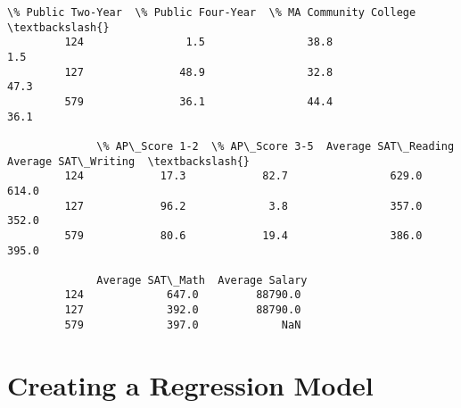 \documentclass[11pt]{article}
\begin{document}
\begin{Verbatim}[commandchars=\\\{\}]
              \% Public Two-Year  \% Public Four-Year  \% MA Community College  \textbackslash{}
         124                1.5                38.8                     1.5   
         127               48.9                32.8                    47.3   
         579               36.1                44.4                    36.1   
         
              \% AP\_Score 1-2  \% AP\_Score 3-5  Average SAT\_Reading  Average SAT\_Writing  \textbackslash{}
         124            17.3            82.7                629.0                614.0   
         127            96.2             3.8                357.0                352.0   
         579            80.6            19.4                386.0                395.0   
         
              Average SAT\_Math  Average Salary  
         124             647.0         88790.0  
         127             392.0         88790.0  
         579             397.0             NaN  
\end{Verbatim}
            
    \section{Creating a Regression Model}\label{creating-a-regression-model}
\end{document}
